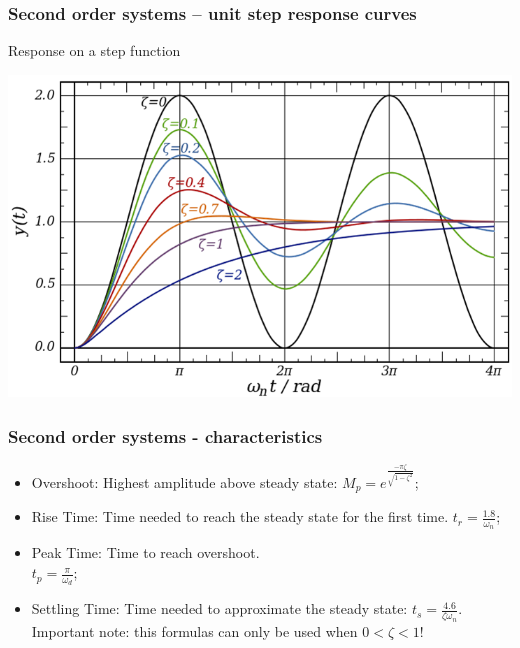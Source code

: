 \begin{frame}
\frametitle{Second order systems – unit step response curves}
Response on a step function
\begin{center}
	\includegraphics[width=0.8\linewidth]{Afbeelding6}
\end{center}
\end{frame}

\begin{frame}
\frametitle{Second order systems - characteristics}
\begin{itemize}
	\item Overshoot: Highest amplitude above steady state:  $M_p = e^{\frac{-\pi\zeta}{\sqrt{1-\zeta^2}}}$;
	\item Rise Time: Time needed to reach the steady state for the first time. $t_r = \frac{1.8}{\omega_n}$;
	\item Peak Time: Time to reach overshoot.\\$t_p =\frac{\pi}{\omega_d}$;
	\item Settling Time: Time needed to approximate the steady state: $t_s = \frac{4.6}{\zeta\omega_n}$. Important note: this formulas can only be used when  $0<\zeta<1$!
\end{itemize} 
\end{frame}

